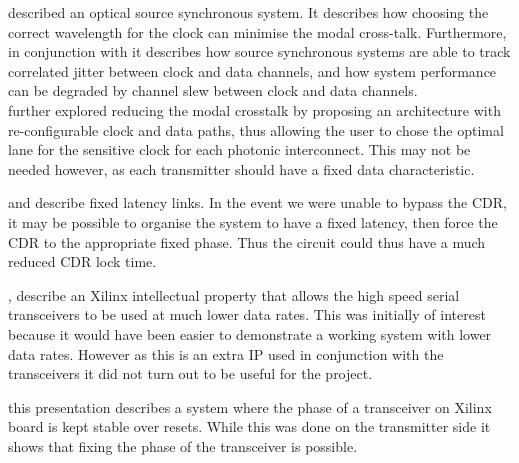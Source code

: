 \noindent \cite{williams2016source} described an optical source synchronous
system. It describes how choosing the correct wavelength for the clock can
minimise the modal cross-talk. Furthermore, in conjunction with
\cite{ragab2011receiver} it describes how source synchronous systems are able
to track correlated jitter between clock and data channels, and how system
performance can be degraded by channel slew between clock and data channels.\\
\cite{williams2019reconfiguration} further explored reducing the modal
crosstalk by proposing an architecture with re-configurable clock and data
paths, thus allowing the user to chose the optimal lane for the sensitive clock
for each photonic interconnect. This may not be needed however, as each
transmitter should have a fixed data characteristic.

\noindent \cite{chen2017optimization} and \cite{fixed_latency} describe fixed
latency links. In the event we were unable to bypass the CDR, it may be
possible to organise the system to have a fixed latency, then force the CDR to
the appropriate fixed phase. Thus the circuit could thus have a much reduced
CDR lock time.

\noindent \cite{dru_guide}, \cite{nidru} describe an Xilinx intellectual
property that allows the high speed serial transceivers to be used at much
lower data rates. This was initially of interest because it would have been
easier to demonstrate a working system with lower data rates. However as this
is an extra IP used in conjunction with the transceivers it did not turn out to
be useful for the project. 

\noindent \cite{mendes_transceiver} this presentation describes a system where
the phase of a transceiver on Xilinx board is kept stable over resets. While
this was done on the transmitter side it shows that fixing the phase of the
transceiver is possible.

